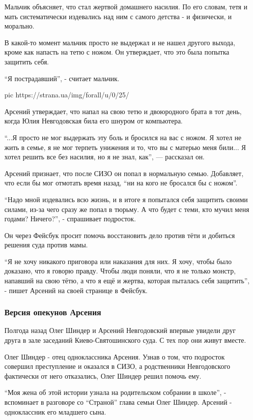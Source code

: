 Мальчик объясняет, что стал жертвой домашнего насилия. По его словам, тетя и
мать систематически издевались над ним с самого детства - и физически, и
морально.

В какой-то момент мальчик просто не выдержал и не нашел другого выхода, кроме
как напасть на тетю с ножом. Он утверждает, что это была попытка защитить себя. 

“Я пострадавший”, - считает мальчик. 

\ifcmt
pic https://strana.ua/img/forall/u/0/25/%
\fi

Арсений утверждает, что напал на свою тетю и двоюродного брата в тот день,
когда Юлия Невгодовская била его шнуром от компьютера. 

“...Я просто не мог выдержать эту боль и бросился на вас с ножом. Я хотел не
жить в семье, я не мог терпеть унижения и то, что вы с матерью меня били... Я
хотел решить все без насилия, но я не знал, как”, — рассказал он.

Арсений признает, что после СИЗО он попал в нормальную семью. Добавляет, что
если бы мог отмотать время назад, “ни на кого не бросался бы с ножом”.

“Надо мной издевались всю жизнь, и в итоге я попытался себя защитить своими
силами, из-за чего сразу же попал в тюрьму. А что будет с теми, кто мучил меня
годами? Ничего?”, - спрашивает подросток.

Он через Фейсбук просит помочь восстановить дело против тёти и добиться решения
суда против мамы. 

“Я не хочу никакого приговора или наказания для них. Я хочу, чтобы было
доказано, что я говорю правду. Чтобы люди поняли, что я не только монстр,
напавший на свою тётю, а что я ещё и жертва, которая пыталась себя защитить”, -
пишет Арсений на своей странице в Фейсбук. 

\subsubsection{Версия опекунов Арсения}

Полгода назад Олег Шиндер и Арсений Невгодовский впервые увидели друг друга в
зале заседаний Киево-Святошинского суда. С тех пор они живут вместе. 

Олег Шиндер - отец одноклассника Арсения. Узнав о том, что подросток совершил
преступление и оказался в СИЗО, а родственники Невгодовского фактически от него
отказались, Олег Шиндер решил помочь ему. 

“Моя жена об этой истории узнала на родительском собрании в школе”, -
вспоминает в разговоре со “Страной” глава семьи Олег Шиндер. Арсений -
одноклассник его младшего сына. 

